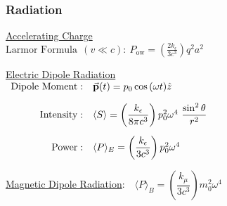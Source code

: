 \documentclass[12pt]{article}
\begin{document}
\vspace{15pt}
\begin{minipage}[t]{.46\textwidth}
	\subsubsection{Radiation}

	\vspace{5pt}\noindent
	\underline{Accelerating Charge}\\
	\(\displaystyle \text{Larmor Formula}\ \ (v \ll c):\ P_\text{ow}
		= \left(\frac{2k_\epsilon}{3c^3}\right) q^2 a^2\)

	\vspace{15pt}\noindent
	\underline{Electric Dipole Radiation}\\[10pt]
	\(\begin{array}{r l}
		\text{Dipole Moment}:	&\vec{\mathbf{p}}(t) = p_0 \cos{(\omega t)} \hat{z}\\[10pt]
		\text{Intensity}:		&\langle S \rangle 
			= \left( \dfrac{k_\epsilon}{8\pi c^3} \right) p^2_0 \omega^4\ \dfrac{\sin^2 \theta}{r^2}\\[15pt]
		\text{Power}:			&\langle P \rangle_E = \left( \dfrac{k_\epsilon}{3c^3} \right) p^2_0 \omega^4
	\end{array}\)

	\vspace{15pt}\noindent
	\underline{Magnetic Dipole Radiation}:\ \ \(\langle P \rangle_B 
		= \left(\dfrac{k_\mu}{3c^3}\right) m^2_0 \omega^4\)
\end{minipage}


%
%
\newpage

\end{document}
